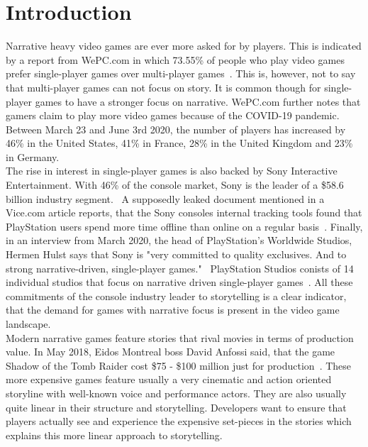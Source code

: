 \chapter{Introduction}
Narrative heavy video games are ever more asked for by players. This is indicated by a report from WePC.com in which 73.55\% of people who play video games prefer single-player games over multi-player games~\cite{WePC2021}. This is, however, not to say that multi-player games can not focus on story. It is common though for single-player games to have a stronger focus on narrative. WePC.com further notes that gamers claim to play more video games because of the COVID-19 pandemic. Between March 23 and June 3rd 2020, the number of players has increased by 46\% in the United States, 41\% in France, 28\% in the United Kingdom and 23\% in Germany.~\cite{WePC2021}\\
The rise in interest in single-player games is also backed by Sony Interactive Entertainment. With 46\% of the console market, Sony is the leader of a \$58.6 billion industry segment.~\cite{Dealessandri2021} A supposedly leaked document mentioned in a Vice.com article reports, that the Sony consoles internal tracking tools found that PlayStation users spend more time offline than online on a regular basis~\cite{Klepek2020}. Finally, in an interview from March 2020, the head of PlayStation's Worldwide Studios, Hermen Hulst says that Sony is "very committed to quality exclusives. And to strong narrative-driven, single-player games."~\cite{Shuman2021} PlayStation Studios conists of 14 individual studios that focus on narrative driven single-player games~\cite{Sony2021}. All these commitments of the console industry leader to storytelling is a clear indicator, that the demand for games with narrative focus is present in the video game landscape.\\
Modern narrative games feature stories that rival movies in terms of production value. In May 2018, Eidos Montreal boss David Anfossi said, that the game Shadow of the Tomb Raider cost \$75 - \$100 million just for production~\cite{Dring2018}. These more expensive games feature usually a very cinematic and action oriented storyline with well-known voice and performance actors. They are also usually quite linear in their structure and storytelling. Developers want to ensure that players actually see and experience the expensive set-pieces in the stories  which explains this more linear approach to storytelling.\\
